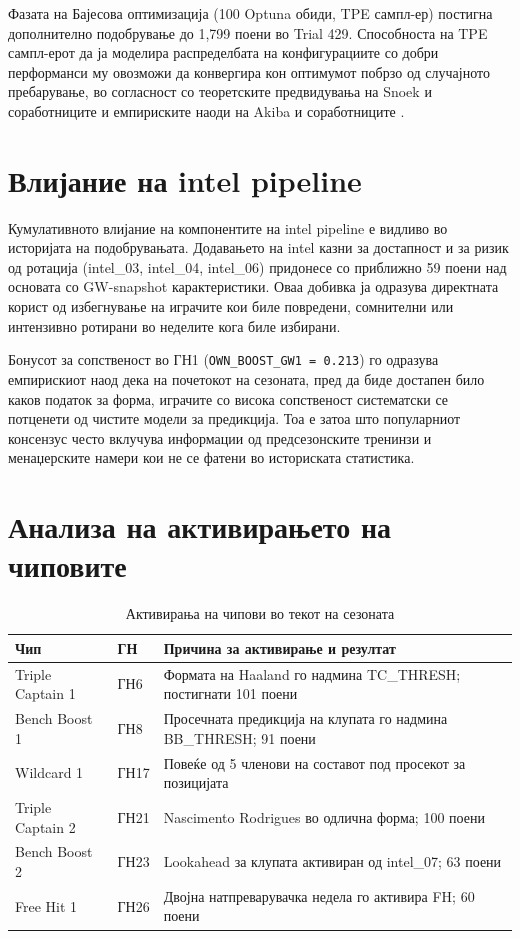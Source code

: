 Фазата на Бајесова оптимизација (100 Optuna обиди, TPE сампл-ер) постигна дополнително подобрување до 1{,}799 поени во Trial 429. Способноста на TPE сампл-ерот да ја моделира распределбата на конфигурациите со добри перформанси му овозможи да конвергира кон оптимумот побрзо од случајното пребарување, во согласност со теоретските предвидувања на Snoek и соработниците \cite{snoek2012practical} и емпириските наоди на Akiba и соработниците \cite{akiba2019optuna}.

\section{Влијание на intel pipeline}

Кумулативното влијание на компонентите на intel pipeline е видливо во историјата на подобрувањата. Додавањето на intel казни за достапност и за ризик од ротација (intel\_03, intel\_04, intel\_06) придонесе со приближно 59 поени над основата со GW-snapshot карактеристики. Оваа добивка ја одразува директната корист од избегнување на играчите кои биле повредени, сомнителни или интензивно ротирани во неделите кога биле избирани.

Бонусот за сопственост во ГН1 (\texttt{OWN\_BOOST\_GW1 = 0.213}) го одразува емпирискиот наод дека на почетокот на сезоната, пред да биде достапен било каков податок за форма, играчите со висока сопственост систематски се потценети од чистите модели за предикција. Тоа е затоа што популарниот консензус често вклучува информации од предсезонските тренинзи и менаџерските намери кои не се фатени во историската статистика.

\section{Анализа на активирањето на чиповите}

\begin{table}[h]
\centering
\caption{Активирања на чипови во текот на сезоната}
\label{tab:chips_mk}
\begin{tabular}{llp{6.5cm}}
\toprule
\textbf{Чип} & \textbf{ГН} & \textbf{Причина за активирање и резултат} \\
\midrule
Triple Captain 1 & ГН6  & Формата на Haaland го надмина TC\_THRESH; постигнати 101 поени \\
Bench Boost 1    & ГН8  & Просечната предикција на клупата го надмина BB\_THRESH; 91 поени \\
Wildcard 1       & ГН17 & Повеќе од 5 членови на составот под просекот за позицијата \\
Triple Captain 2 & ГН21 & Nascimento Rodrigues во одлична форма; 100 поени \\
Bench Boost 2    & ГН23 & Lookahead за клупата активиран од intel\_07; 63 поени \\
Free Hit 1       & ГН26 & Двојна натпреварувачка недела го активира FH; 60 поени \\
\bottomrule
\end{tabular}
\end{table}

